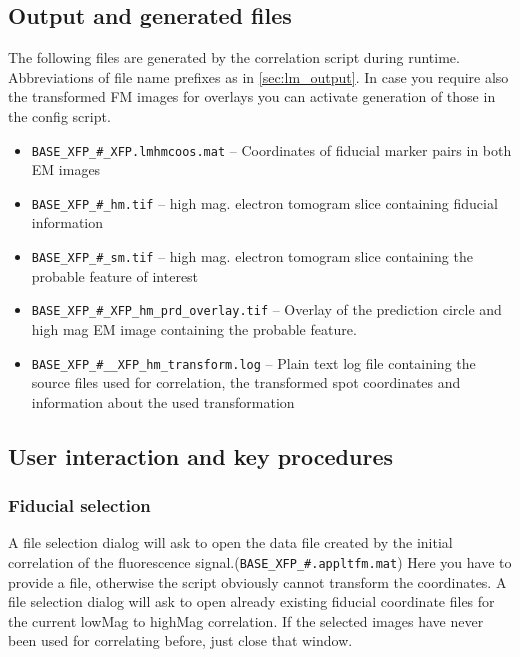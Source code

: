 \documentclass[10pt,a4paper,onepage,DIV12]{scrartcl}
\begin{document}
\subsection{Output and generated files}
The following files are generated by the correlation script during runtime. Abbreviations of file name prefixes as in \ref{sec:lm_output}. In case you require also the transformed FM images for overlays you can activate generation of those in the config script.
\begin{itemize}
\item \texttt{BASE\_XFP\_\#\_XFP.lmhmcoos.mat} -- Coordinates of fiducial marker pairs in both EM images


\item \texttt{BASE\_XFP\_\#\_hm.tif} -- high mag. electron tomogram slice containing fiducial information 
\item \texttt{BASE\_XFP\_\#\_sm.tif} -- high mag. electron tomogram slice containing the probable feature of interest 
\item \texttt{BASE\_XFP\_\#\_XFP\_hm\_prd\_overlay.tif} -- Overlay of the prediction circle and high mag EM image containing the probable feature.


\item \texttt{BASE\_XFP\_\#\_\_XFP\_hm\_transform.log} -- Plain text log file containing the source files used for correlation, the transformed spot coordinates and information about the used transformation
\end{itemize}
\newpage
\subsection{User interaction and key procedures}
\subsubsection{Fiducial selection}
\label{sec:HM_fiducials}
A file selection dialog will ask to open the data file created by the initial correlation of the fluorescence signal.(\texttt{BASE\_XFP\_\#.appltfm.mat}) Here you have to provide a file, otherwise the script obviously cannot transform the coordinates.%
A file selection dialog will ask to open already existing fiducial coordinate files for the current lowMag to highMag correlation. If the selected images have never been used for correlating before, just close that window.\\
\end{document}
